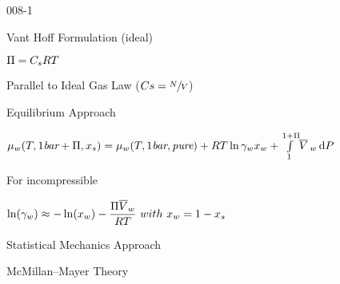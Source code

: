 \begin{mitframe}{008-1}


\begin{listone}

	\item Vant Hoff Formulation (ideal)
	
    \begin{listtwo} 
		
        \item $\osmpress = \conc_{s}\gasconst\Temp $
	    	\item Parallel to Ideal Gas Law ($\conc s  = \sfrac{\nummoles}{\vol}$)
	
    \end{listtwo}
	
    \item Equilibrium Approach
	
    \begin{listtwo}
    
		\item $\chempot_{w}(\Temp,1\textit{bar}+\osmpress,\specfrac{s}) = \chempot_{w}(\Temp,1\textit{bar},\textit{pure})+\gasconst\Temp\ln\surftens_{w}\specfrac{w}+\int\limits_{1}^{1+\osmpress}\!\overline{\vol}\,_{w}\, \mathrm{d}\p$
		
        \begin{listthree}
        
			\item For incompressible
            
			\begin{listfour}
					\item $\ln(\surftens_{w}) \approx -\ln(\specfrac{w})-\dfrac{\osmpress\overline{\vol}_{w}}{\gasconst\Temp}~with~\specfrac{w} = 1 - \specfrac{s}$
    			
            \end{listfour}
            
		\end{listthree}
        
	\end{listtwo}
    
	\item Statistical Mechanics Approach
    
	\begin{listtwo}
    
		\item McMillan--Mayer Theory
        
		\begin{listthree}
        

\end{listthree}
\end{listtwo}
\end{listone}
\end{mitframe}
